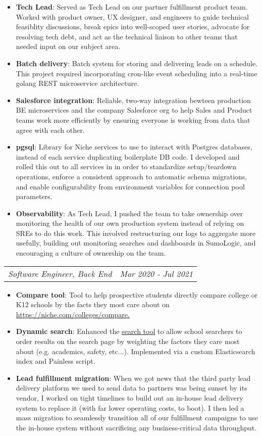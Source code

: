 \documentclass[letterpaper,11pt]{article}
\makeatletter
\newenvironment{resumeSubHeadingList}{\begin{itemize}[leftmargin=*]}{\end{itemize}}
\newenvironment{resumeItemList}{\begin{itemize}}{\end{itemize}\vspace{-5pt}}
\newcommand{\resumeItem}[2]{
  \item\small{
    \textbf{#1}{: #2 \vspace{-2pt}}
  }
}
\newcommand{\resumeSubSubheading}[2]{
    \begin{tabular*}{0.97\textwidth}{l@{\extracolsep{\fill}}r}
      \textit{\small#1} & \textit{\small #2} \\
    \end{tabular*}\vspace{-5pt}
}
\makeatother
\begin{document}
\begin{resumeSubHeadingList}
\begin{resumeItemList}
          \resumeItem{Tech Lead}{Served as Tech Lead on our partner fulfillment product team. Worked with product owner, UX designer, and engineers to guide technical feasiblity discussions, break epics into well-scoped user stories, advocate for resolving tech debt, and act as the technical liaison to other teams that needed input on our subject area.}
          \resumeItem{Batch delivery}{Batch system for storing and delivering leads on a schedule. This project required incorporating cron-like event scheduling into a real-time golang REST microservice architecture.}
          \resumeItem{Salesforce integration}{Reliable, two-way integration bewteen production BE microservices and the company Salesforce org to help Sales and Product teams work more efficiently by ensuring everyone is working from data that agree with each other.}
          \resumeItem{pgsql}{Library for Niche services to use to interact with Postgres databases, instead of each service duplicating boilerplate DB code. I developed and rolled this out to all services in in order to standardize setup/teardown operations, enforce a consistent approach to automatic schema migrations, and enable configurability from environment variables for connection pool parameters.}
          \resumeItem{Observability}{As Tech Lead, I pushed the team to take ownership over monitoring the health of our own production system instead of relying on SREs to do this work. This involved restructuring our logs to aggregate more usefully, building out monitoring searches and dashboards in SumoLogic, and encouraging a culture of ownership on the team.}
        \end{resumeItemList}
      \resumeSubSubheading
        {Software Engineer, Back End}{Mar 2020 - Jul 2021}
        \begin{resumeItemList}
          \resumeItem{Compare tool}{Tool to help prospective students directly compare college or K12 schools by the facts they most care about on \href{https://niche.com/colleges/compare}{https://niche.com/colleges/compare.}}
          \resumeItem{Dynamic search}{Enhanced the \href{https://www.niche.com/colleges/search/college-quiz/}{search tool} to allow school searchers to order results on the search page by weighting the factors they care most about (e.g. academics, safety, etc...). Implemented via a custom Elasticsearch index and Painless script.}
          \resumeItem{Lead fulfillment migration}{When we got news that the third party lead delivery platform we used to send data to partners was being sunset by its vendor, I worked on tight timelines to build out an in-house lead delivery system to replace it (with far lower operating costs, to boot). I then led a mass migration to seamlessly transition all of our fulfillment campaigns to use the in-house system without sacrificing any business-critical data throughput.}
          \end{resumeItemList}
        

\end{resumeSubHeadingList}
\end{document}

